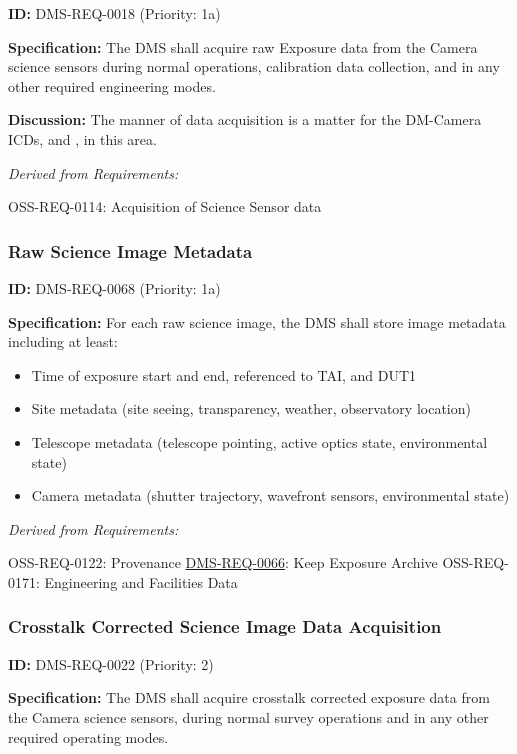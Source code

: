 \documentclass[SE,toc,lsstdraft]{lsstdoc}
\begin{document}
\label{DMS-REQ-0018}
\textbf{ID:} DMS-REQ-0018 (Priority: 1a)

\textbf{Specification:} The DMS shall acquire raw Exposure data from the Camera science sensors during normal operations, calibration data collection, and in any other required engineering modes.

\textbf{Discussion:} The manner of data acquisition is a matter for the DM-Camera ICDs,  and , in this area.

\emph{Derived from Requirements:}

OSS-REQ-0114:
Acquisition of Science Sensor data \newline

\subsubsection{Raw Science Image Metadata}

\label{DMS-REQ-0068}
\textbf{ID:} DMS-REQ-0068 (Priority: 1a)

\textbf{Specification:} For each raw science image, the DMS shall store image metadata including at least:
\begin{itemize}
\item Time of exposure start and end, referenced to TAI, and DUT1
\item Site metadata (site seeing, transparency, weather, observatory location)
\item Telescope metadata (telescope pointing, active optics state, environmental state)
\item Camera metadata (shutter trajectory, wavefront sensors, environmental state)
\end{itemize}

\emph{Derived from Requirements:}

OSS-REQ-0122:
Provenance \newline
\hyperref[DMS-REQ-0066]{DMS-REQ-0066}:
Keep Exposure Archive \newline
OSS-REQ-0171:
Engineering and Facilities Data \newline

\subsubsection{Crosstalk Corrected Science Image Data Acquisition}

\label{DMS-REQ-0022}
\textbf{ID:} DMS-REQ-0022 (Priority: 2)

\textbf{Specification:} The DMS shall acquire crosstalk corrected exposure data from the Camera science sensors, during normal survey operations and in any other required operating modes.
\end{document}
